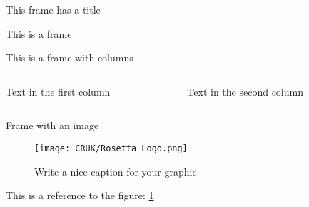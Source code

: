 \begin{frame}{This frame has a title}

This is a frame
\end{frame}

\begin{frame}{This is a frame with columns}
\begin{columns}
\begin{column}{.5\paperwidth}
Text in the first column
\end{column}
\begin{column}{.5\paperwidth}
Text in the second column
\end{column}
\end{columns}
\end{frame}

\begin{frame}{Frame with an image}
\begin{figure}[H]
	\label{figure1}
	\centering
    \texttt{[image: CRUK/Rosetta\_Logo.png]}
    \caption{Write a nice caption for your graphic}
\end{figure}

This is a reference to the figure: \cref{figure1}
\end{frame}